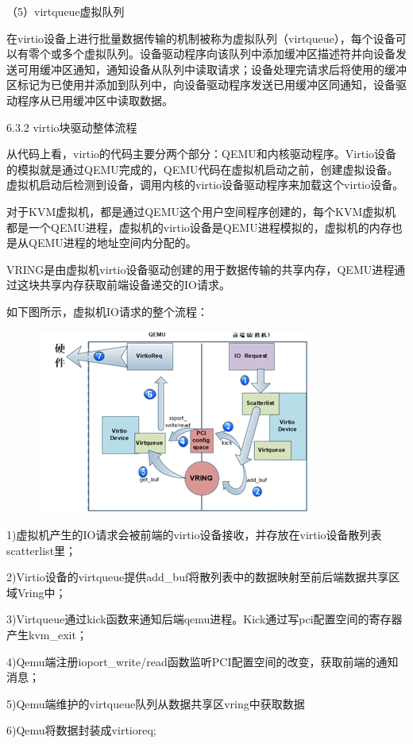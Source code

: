 （5）virtqueue虚拟队列

在virtio设备上进⾏批量数据传输的机制被称为虚拟队列（virtqueue），每个设备可以有零个或多个虚拟队列。设备驱动程序向该队列中添加缓冲区描述符并向设备发送可⽤缓冲区通知，通知设备从队列中读取请求；设备处理完请求后将使⽤的缓冲区标记为已使⽤并添加到队列中，向设备驱动程序发送已⽤缓冲区同通知，设备驱动程序从已⽤缓冲区中读取数据。

6.3.2 virtio块驱动整体流程

从代码上看，virtio的代码主要分两个部分：QEMU和内核驱动程序。Virtio设备的模拟就是通过QEMU完成的，QEMU代码在虚拟机启动之前，创建虚拟设备。虚拟机启动后检测到设备，调用内核的virtio设备驱动程序来加载这个virtio设备。

对于KVM虚拟机，都是通过QEMU这个用户空间程序创建的，每个KVM虚拟机都是一个QEMU进程，虚拟机的virtio设备是QEMU进程模拟的，虚拟机的内存也是从QEMU进程的地址空间内分配的。

VRING是由虚拟机virtio设备驱动创建的用于数据传输的共享内存，QEMU进程通过这块共享内存获取前端设备递交的IO请求。

如下图所示，虚拟机IO请求的整个流程：

\begin{figure}[H]
    \centering
    \includegraphics{figures/06-03-2.png}
\end{figure}
1)虚拟机产生的IO请求会被前端的virtio设备接收，并存放在virtio设备散列表scatterlist里；

2)Virtio设备的virtqueue提供add_buf将散列表中的数据映射至前后端数据共享区域Vring中；

3)Virtqueue通过kick函数来通知后端qemu进程。Kick通过写pci配置空间的寄存器产生kvm_exit；

4)Qemu端注册ioport_write/read函数监听PCI配置空间的改变，获取前端的通知消息；

5)Qemu端维护的virtqueue队列从数据共享区vring中获取数据

6)Qemu将数据封装成virtioreq;

